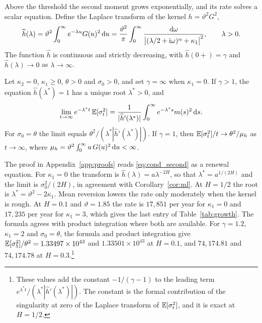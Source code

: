 Above the threshold the second moment grows exponentially, and its rate solves a scalar equation. Define the Laplace transform of the kernel $h=\vartheta^2G^2$,
\begin{equation}\label{eq:h_hat}
\widehat h(\lambda)=\vartheta^2\int_0^\infty e^{-\lambda u}G(u)^2\,\D u
=\frac{\vartheta^2}{\pi}\int_0^\infty\frac{\D\omega}{\big|(\lambda/2+\mathrm{i}\omega)^\alpha+\kappa_1\big|^2},\qquad\lambda>0 .
\end{equation}
The function $\widehat h$ is continuous and strictly decreasing, with $\widehat h(0+)=\gamma$ and $\widehat h(\lambda)\to0$ as $\lambda\to\infty$.

\begin{proposition}\label{prop:growth}
Let $\kappa_2=0$, $\kappa_1\ge0$, $\theta>0$ and $\sigma_0>0$, and set $\gamma=\infty$ when $\kappa_1=0$. If $\gamma>1$, the equation $\widehat h(\lambda^*)=1$ has a unique root $\lambda^*>0$, and
\begin{equation}\label{eq:growth}
\lim_{t\to\infty}e^{-\lambda^*t}\,\E[\sigma_t^2]=\frac{1}{|\widehat h'(\lambda^*)|}\int_0^\infty e^{-\lambda^*s}m(s)^2\,\D s .
\end{equation}
For $\sigma_0=\theta$ the limit equals $\theta^2/(\lambda^*|\widehat h'(\lambda^*)|)$. If $\gamma=1$, then $\mathbb{E}[\sigma_t^2]/t\to\theta^2/\mu_h$ as $t\to\infty$, where $\mu_h=\vartheta^2\int_0^\infty u\,G(u)^2\,\mathrm{d} u<\infty$.
\end{proposition}

The proof in Appendix~\ref{app:proofs} reads \eqref{eq:cond_second} as a renewal equation. For $\kappa_1=0$ the transform is $\widehat h(\lambda)=a\lambda^{-2H}$, so that $\lambda^*=a^{1/(2H)}$ and the limit is $\sigma_0^2/(2H)$, in agreement with Corollary~\ref{cor:ml}. At $H=1/2$ the root is $\lambda^*=\vartheta^2-2\kappa_1$. Mean reversion lowers the rate only moderately when the kernel is rough. At $H=0.1$ and $\vartheta=1.85$ the rate is $17{,}851$ per year for $\kappa_1=0$ and $17{,}235$ per year for $\kappa_1=3$, which gives the last entry of Table~\ref{tab:growth}. The formula agrees with product integration where both are available. For $\gamma=1.2$, $\kappa_1=2$ and $\sigma_0=\theta$, the formula and product integration give $\mathbb{E}[\sigma_5^2]/\theta^2=1.33497\times10^{43}$ and $1.33501\times10^{43}$ at $H=0.1$, and $74{,}174.81$ and $74{,}174.78$ at $H=0.3$.\footnote{These values add the constant $-1/(\gamma-1)$ to the leading term $e^{\lambda^*t}/(\lambda^*|\widehat h'(\lambda^*)|)$. The constant is the formal contribution of the singularity at zero of the Laplace transform of $\mathbb{E}[\sigma_t^2]$, and it is exact at $H=1/2$.}

